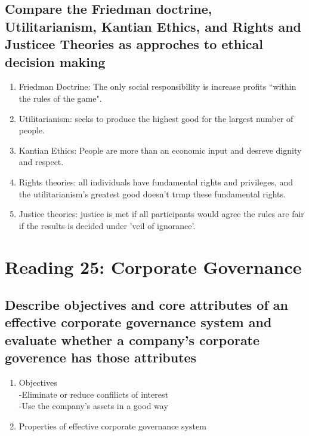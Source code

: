 \documentclass{article}
\newcommand{\be}{\begin{enumerate}}
\newcommand{\ee}{\end{enumerate}}
\begin{document}
\subsection{Compare the Friedman doctrine, Utilitarianism, Kantian Ethics,
and Rights and Justicee Theories as approches to ethical decision making}
\be
    \item Friedman Doctrine: The only social responsibility is increase profits 
        ``within the rules of the game".
    \item Utilitarianism: seeks to produce the highest good for the largest number
        of people.
    \item Kantian Ethics: People are more than an economic input and desreve dignity
        and respect.
    \item Rights theories: all individuals have fundamental rights and privileges, and the
        utilitarianism's greatest good doesn't trmp these fundamental rights.
    \item Justice theories: justice is met if all participants would agree the rules
        are fair if the results is decided under 'veil of ignorance'.
\ee


\section{Reading 25: Corporate Governance}
\subsection{Describe objectives and core attributes of an effective corporate 
governance system and evaluate whether a company's corporate goverence has those
attributes}
\be
    \item Objectives
        \\-Eliminate or reduce confilicts of interest
        \\-Use the company's assets in a good way
    \item Properties of effective corporate governance system
\ee
\end{document}
